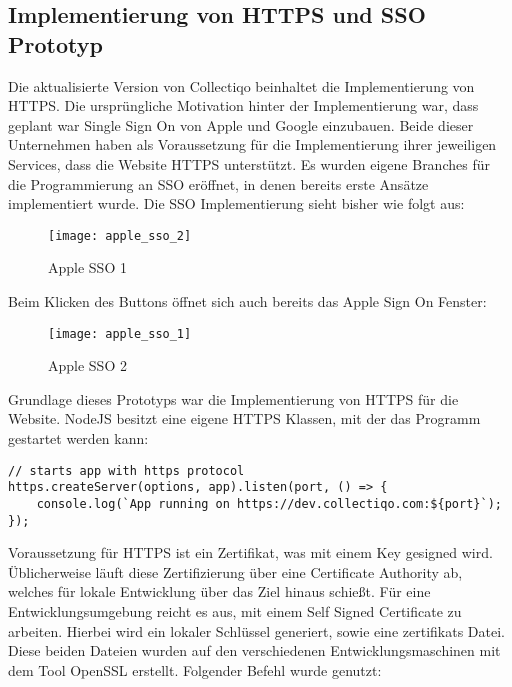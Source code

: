 \subsection{Implementierung von HTTPS und SSO Prototyp}\label{subsec:implementierung-von-https}

Die aktualisierte Version von Collectiqo beinhaltet die Implementierung von HTTPS.
Die ursprüngliche Motivation hinter der Implementierung war, dass geplant war Single Sign On von Apple und Google einzubauen.
Beide dieser Unternehmen haben als Voraussetzung für die Implementierung ihrer jeweiligen Services, dass die Website HTTPS unterstützt.
Es wurden eigene Branches für die Programmierung an SSO eröffnet, in denen bereits erste Ansätze implementiert wurde.
Die SSO Implementierung sieht bisher wie folgt aus:

\begin{figure}[h]
    \centering
    \texttt{[image: apple\_sso\_2]}
    \caption{Apple SSO 1}
    \label{fig:apple_sso_1}
\end{figure}

Beim Klicken des Buttons öffnet sich auch bereits das Apple Sign On Fenster:

\begin{figure}[h]
    \centering
    \texttt{[image: apple\_sso\_1]}
    \caption{Apple SSO 2}
    \label{fig:apple_sso_2}
\end{figure}

Grundlage dieses Prototyps war die Implementierung von HTTPS für die Website.
NodeJS besitzt eine eigene HTTPS Klassen, mit der das Programm gestartet werden kann:

\vspace{1em}
\lstset{language=JavaScript}
\begin{lstlisting}[label={lst:https}]
// starts app with https protocol
https.createServer(options, app).listen(port, () => {
    console.log(`App running on https://dev.collectiqo.com:${port}`);
});
\end{lstlisting}
\vspace{1em}

Voraussetzung für HTTPS ist ein Zertifikat, was mit einem Key gesigned wird.
Üblicherweise läuft diese Zertifizierung über eine Certificate Authority ab, welches für lokale Entwicklung über das Ziel hinaus schießt.
Für eine Entwicklungsumgebung reicht es aus, mit einem Self Signed Certificate zu arbeiten.
Hierbei wird ein lokaler Schlüssel generiert, sowie eine zertifikats Datei.
Diese beiden Dateien wurden auf den verschiedenen Entwicklungsmaschinen mit dem Tool OpenSSL erstellt.
Folgender Befehl wurde genutzt:

